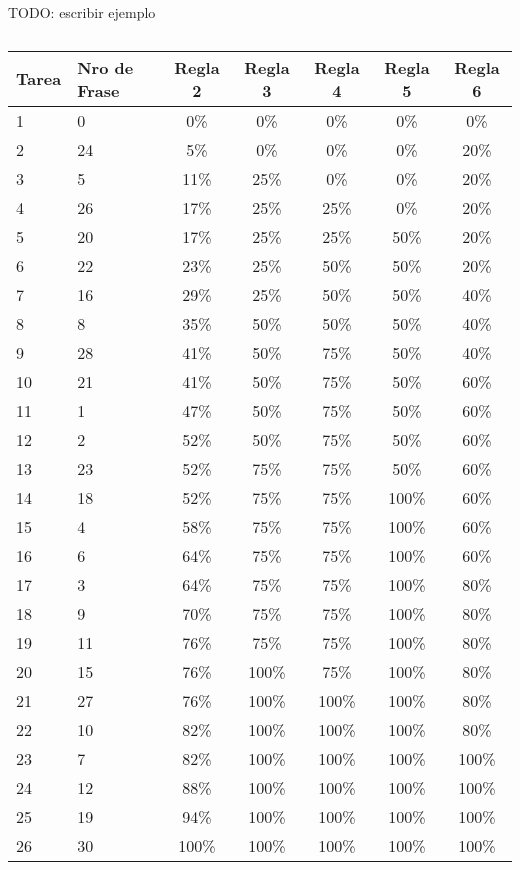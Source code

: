 TODO: escribir ejemplo
{\tiny \begin{table}[H]
	\centering
	\begin{tabular}{|l|l|c|c|c|c|c|}
		\hline
		 \textbf{Tarea}  & \textbf{Nro de Frase} &  \textbf{Regla 2} & \textbf{Regla 3} & \textbf{Regla 4} & \textbf{Regla 5} & \textbf{Regla 6} \\ \hline
		1 & 0 & 0\% & 0\% & 0\% & 0\% & 0\%\\ \hline
		2 & 24 & 5\% & 0\% & 0\% & 0\% & 20\% \\ \hline
		3 & 5 & 11\% & 25\% & 0\% & 0\% & 20\% \\ \hline
		4 & 26 & 17\% & 25\% & 25\% & 0\% & 20\%\\ \hline
		5 & 20 & 17\% & 25\% & 25\% & 50\% & 20\%\\ \hline
		6 & 22 & 23\% & 25\% & 50\% & 50\% & 20\%\\ \hline
		7 & 16 & 29\% & 25\% & 50\% & 50\% & 40\%\\ \hline
		8 & 8 & 35\% & 50\% & 50\% & 50\% & 40\%\\ \hline
		9 & 28 & 41\% & 50\% & 75\% & 50\% & 40\%\\ \hline
		10 & 21 & 41\% & 50\% & 75\% & 50\% & 60\%\\ \hline
		11 & 1 &  47\% & 50\% & 75\% & 50\% & 60\%\\ \hline
		12 & 2 &  52\% & 50\% & 75\% & 50\% & 60\%\\ \hline
		13 & 23 & 52\% & 75\% & 75\% & 50\% & 60\%\\ \hline
		14 & 18 & 52\% & 75\% & 75\% & 100\% & 60\%\\ \hline
		15 & 4 &  58\% & 75\% & 75\% & 100\% & 60\%\\ \hline
		16 & 6 &  64\% & 75\% & 75\% & 100\% & 60\%\\ \hline
		17 & 3 &  64\% & 75\% & 75\% & 100\% & 80\% \\ \hline
		18 & 9 &  70\% & 75\% & 75\% & 100\% & 80\%\\ \hline
		19 & 11 & 76\% & 75\% & 75\% & 100\% & 80\%\\ \hline
		20 & 15 & 76\% & 100\% & 75\% & 100\% & 80\%\\ \hline
		21 & 27 & 76\% & 100\% & 100\% & 100\% & 80\%\\ \hline
		22 & 10 & 82\% & 100\% & 100\% & 100\% & 80\% \\ \hline
		23 & 7 &  82\% & 100\% & 100\% & 100\% & 100\% \\ \hline
		24 & 12 & 88\% & 100\% & 100\% & 100\% & 100\%\\ \hline
		25 & 19 & 94\% & 100\% & 100\% & 100\% & 100\% \\ \hline
		26 & 30 & 100\% & 100\% & 100\% & 100\% & 100\% \\ \hline
	\end{tabular}
	\caption{}
	\label{}
\end{table}
}

